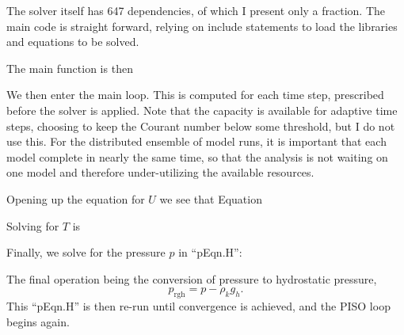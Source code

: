 \documentclass[12pt]{report}
\begin{document}
The solver itself has 647 dependencies, of which I present only a fraction.
The main code is straight forward, relying on include statements to load the libraries and equations to be solved.



The main function is then



We then enter the main loop.
This is computed for each time step, prescribed before the solver is applied.
Note that the capacity is available for adaptive time steps, choosing to keep the Courant number below some threshold, but I do not use this.
For the distributed ensemble of model runs, it is important that each model complete in nearly the same time, so that the analysis is not waiting on one model and therefore under-utilizing the available resources.



Opening up the equation for $U$ we see that Equation



Solving for $T$ is 



Finally, we solve for the pressure $p$ in ``pEqn.H'':



The final operation being the conversion of pressure to hydrostatic pressure,
\begin{equation*} p _\text{rgh} = p - \rho _k g_h . \end{equation*}
This ``pEqn.H'' is then re-run until convergence is achieved, and the PISO loop begins again.
\end{document}
